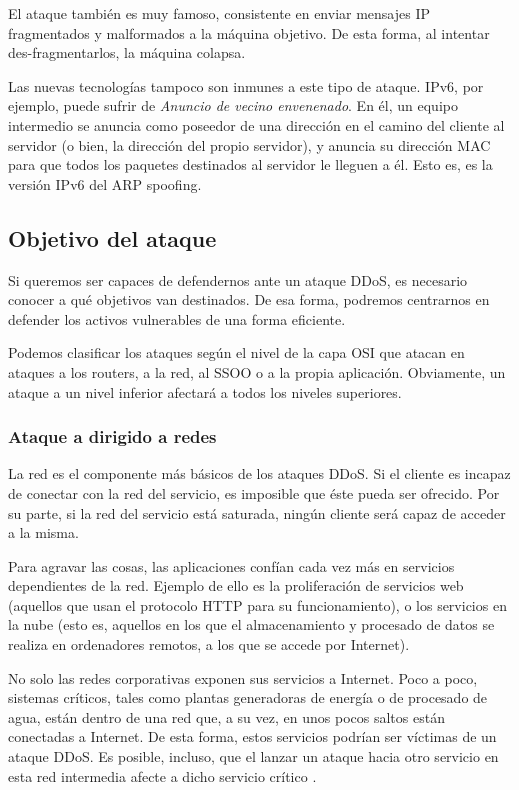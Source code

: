 El ataque \emph{} también es muy famoso, consistente en enviar mensajes IP fragmentados y malformados a 
la máquina objetivo. De esta forma, al intentar des-fragmentarlos, la máquina colapsa.

Las nuevas tecnologías tampoco son inmunes a este tipo de ataque. \gls{IPv6}, por ejemplo, puede sufrir de 
\emph{Anuncio de vecino envenenado}. En él, un equipo intermedio se 
anuncia como poseedor de una dirección en el camino del cliente al servidor (o bien, la dirección del propio servidor), 
y anuncia su dirección \gls{MAC} para que todos los paquetes destinados al servidor le lleguen a él. Esto es, es la 
versión \gls{IPv6} del \gls{ARP} spoofing.

\subsection{Objetivo del ataque}
Si queremos ser capaces de defendernos ante un ataque \gls{DDoS}, es necesario conocer a qué objetivos van destinados. 
De esa 
forma, podremos centrarnos en defender los activos vulnerables de una forma eficiente.

Podemos clasificar los ataques según el nivel de la capa \gls{OSI} que atacan en ataques a los routers, a la red, al 
SSOO o a la propia aplicación. Obviamente, un ataque a un nivel inferior afectará a todos los niveles superiores.

\subsubsection{Ataque a dirigido a redes}
La red es el componente más básicos de los ataques DDoS. Si el cliente es incapaz de conectar con la red del servicio, 
es imposible que éste pueda ser ofrecido. Por su parte, si la red del servicio está saturada, ningún cliente será capaz 
de acceder a la misma.

Para agravar las cosas, las aplicaciones confían cada vez más en servicios dependientes de la red. Ejemplo de ello es 
la proliferación de servicios web (aquellos que usan el protocolo \acrshort{HTTP} para su 
funcionamiento), o los servicios en la nube (esto es, aquellos en los que el almacenamiento 
y procesado de datos se realiza en ordenadores remotos, a los que se accede por Internet). 

No solo las redes corporativas exponen sus servicios a Internet. Poco a poco, sistemas críticos, tales como plantas 
generadoras de energía o de procesado de agua, están dentro de una red que, a su vez, en unos pocos saltos están 
conectadas a Internet. De esta forma, estos servicios podrían ser víctimas de un ataque \gls{DDoS}. Es posible, 
incluso, que el lanzar un ataque hacia otro servicio en esta red intermedia afecte a dicho servicio crítico 
\cite{Raghavan}.

